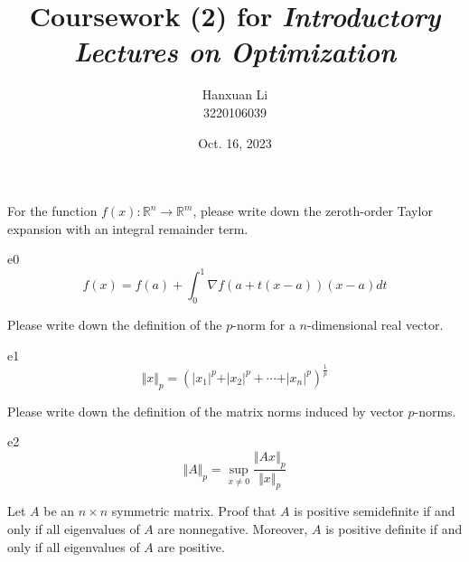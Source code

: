 \documentclass{article}
\title{Coursework (2) for \emph{Introductory Lectures on Optimization}}
\author{Hanxuan Li \\ 3220106039}
\date{Oct. 16, 2023}
\begin{document}
\maketitle

\begin{excercise}\label{e0}
For the function $f(x): \mathbb{R}^n \rightarrow \mathbb{R}^m$, please write down the zeroth-order Taylor expansion with an integral remainder term.
\end{excercise}

\begin{SOLUTION}{e0}
\begin{equation}
	f(x)=f(a)+\int_0^1\nabla f(a+t(x-a))(x-a)dt
\end{equation}
\end{SOLUTION}

\begin{excercise}\label{e1}
Please write down the definition of the $p$-norm for a $n$-dimensional real vector.
\end{excercise}

\begin{SOLUTION}{e1}
\begin{equation}
	\Vert x \Vert_p=(\vert x_1\vert^p+\vert x_2\vert^p+\cdots+\vert x_n\vert^p)^{\frac{1}{p}}
\end{equation}
\end{SOLUTION}


\begin{excercise}\label{e2}
Please write down the definition of the matrix norms induced by vector $p$-norms.
\end{excercise}

\begin{SOLUTION}{e2}
\begin{equation}
	\Vert A \Vert_p=\mathop{sup}_{x\neq0}\frac{\Vert Ax\Vert_p}{\Vert x\Vert_p}
\end{equation}
\end{SOLUTION}


\begin{excercise}\label{e3}
	Let $A$ be an $n \times n$ symmetric matrix. Proof that $A$ is positive semidefinite if and only if all eigenvalues of $A$ are nonnegative. Moreover, $A$ is positive definite if and only if all eigenvalues of $A$ are positive.
\end{excercise}
\end{document}
